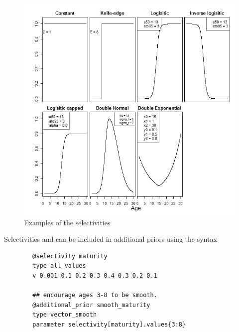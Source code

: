 %
%

\begin{figure}[H]
	\includegraphics[scale = 0.7]{Figures/Selectivities.jpeg}
	\caption{Examples of the selectivities}
\end{figure}

Selectivities  and  can be included in additional priors using the syntax

{\small{\begin{verbatim}
		@selectivity maturity
		type all_values
		v 0.001 0.1 0.2 0.3 0.4 0.3 0.2 0.1

		## encourage ages 3-8 to be smooth.
		@additional_prior smooth_maturity
		type vector_smooth
		parameter selectivity[maturity].values{3:8}

		\end{verbatim}}}

